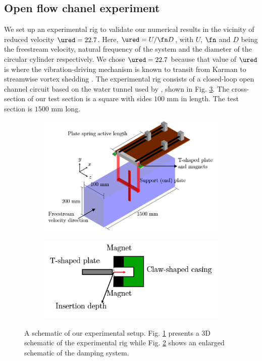 \documentclass[a4paper,fleqn]{cas-sc}
\begin{document}
\subsection{Open flow chanel experiment} \label{ssec:openFlowExp}

We set up an experimental rig to validate our numerical results in the vicinity of reduced velocity $\ured = 22.7$. Here, $\ured = U/\fn D$, with $U$, $\fn$ and $D$ being the freestream velocity, natural frequency of the system and the diameter of the circular cylinder respectively. We chose $\ured = 22.7$ because that value of $\ured$ is where the vibration-driving mechanism is known to transit from Karman to streamwise vortex shedding \citep{Koide2013}. The experimental rig consists of a closed-loop open channel circuit based on the water tunnel used by \citet{Nguyen2012}, shown in Fig. \ref{fig:experimentalSetup}. The cross-section of our test section is a square with sides $100$ mm in length. The test section is $1500$ mm long.

\begin{figure}
  \centering
  \begin{subfigure}[h]{0.5\textwidth}
    \includegraphics[width=\textwidth]{figs/figure3a}
    \caption{}
    \label{fig:rigSketch}
  \end{subfigure}

  \begin{subfigure}[h]{0.35\textwidth}
    \includegraphics[width=\textwidth]{figs/figure3b}
    \caption{}
    \label{fig:damperSketch}
  \end{subfigure}

  \caption{A schematic of our experimental setup. Fig. \ref{fig:rigSketch} presents a 3D schematic of the experimental rig while Fig. \ref{fig:damperSketch} shows an enlarged schematic of the damping system.} \label{fig:experimentalSetup}
\end{figure}
\end{document}
